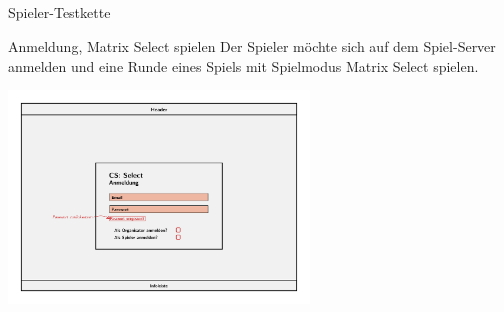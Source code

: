 \documentclass[xcolor=dvipsnames]{beamer}
\begin{document}
	\subsection{}
    \begin{frame}{Spieler-Testkette} 
    	\begin{block}{Anmeldung, Matrix Select spielen}
    		Der Spieler möchte sich auf dem Spiel-Server anmelden und eine Runde eines Spiels mit Spielmodus Matrix Select spielen.
    	\end{block}
        \centering
    	\includegraphics[width=8cm]{../../pictures/Anmeldung.jpg}
    \end{frame}
\end{document}
